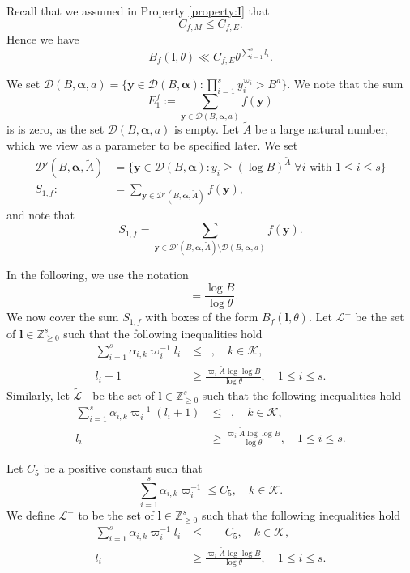 \documentclass[JEP,XML,SOM,Unicode,published]{cedram}
\DeclareMathOperator{\LBt}{\mathit{L(B,\theta)}}
\newcommand{\cD}{\mathcal{D}}
\newcommand{\cBalp}{\cD(B,\bfalp)}
\newcommand{\cBalpa}{\cD(B,\bfalp,a)}
\newcommand{\cBalpA}{\cD'(B,\bfalp,\tilde A)}
\let\tet\theta
\newcommand{\bfy}{\boldsymbol{y}}
\newcommand{\bfalp}{\boldsymbol{\alpha}}
\newcommand{\bfl}{\boldsymbol{l}}
\newcommand{\calK}{\mathcal{K}}
\newcommand{\calL}{\mathcal{L}}
\newcommand{\Z}{\mathbb{Z}}
\theoremstyle{definition}
\numberwithin{theorem}{section}
\begin{document}
Recall that we assumed in Property \ref{property:I} that
\begin{equation*}
C_{f,M}\leq C_{f,E}.
\end{equation*}
Hence we have
\begin{equation}\label{eqn22}
B_f(\bfl,\tet)\ll C_{f,E} \tet^{\sum_{i=1}^s l_i}.
\end{equation}

We set $\cBalpa=\{\bfy\in\cBalp:\prod_{i=1}^sy_i^{\varpi_i}>B^a\}$. We note that the sum
\[
E_1^f:= \sum_{\bfy\in\cBalpa}f(\bfy)
\]
is is zero, as the set $\cBalpa$ is empty.
Let $\tilde{A}$ be a large natural number, which we view as a parameter to be specified later.
We set
\begin{align*}
\cBalpA&=\bigl\{\bfy\in\cBalp:y_i\geq(\log B)^{\tilde{A}}\; \forall i \text{ with }1\leq i\leq s\bigr\}\\
\tag*{and}
S_{1,f}:\!&= \sum_{\bfy\in \cBalpA}f(\bfy),
\end{align*}
and note that
\[
S_{1,f}= \sum_{\bfy\in \cBalpA\setminus\cBalpa}f(\bfy).
\]

In the following, we use the notation
\[\LBt=\frac{\log B}{\log\theta}.\]
We now cover the sum $S_{1,f}$ with boxes of the form $B_f(\bfl,\tet)$. Let $\calL^+$ be the set of $\bfl\in \Z_{\geq 0}^s$ such that the following inequalities hold
\begin{align*}
\sum_{i=1}^s \alpha_{i,k} \varpi_i^{-1}l_i&\leq \LBt,\quad k\in \calK,\\
l_i+1&\geq \frac{\varpi_i \tilde{A} \log \log B}{\log \tet},\quad 1\leq i\leq s.
\end{align*}
Similarly, let $\widetilde{\calL}^-$ be the set of $\bfl\in \Z_{\geq 0}^s$ such that the following inequalities hold
\begin{align*}
\sum_{i=1}^s \alpha_{i,k} \varpi_i^{-1}(l_i +1)&\leq \LBt,\quad k\in \calK,\\
l_i&\geq \frac{\varpi_i \tilde{A} \log \log B}{\log \tet},\quad 1\leq i\leq s.
\end{align*}

Let $C_5$ be a positive constant such that
\[
\sum_{i=1}^s \alpha_{i,k} \varpi_i^{-1}\leq C_5, \quad k\in \calK.
\]
We define $\calL^-$ to be the set of $\bfl\in \Z_{\geq 0}^s$ such that the following inequalities hold
\begin{align*}
\sum_{i=1}^s \alpha_{i,k} \varpi_i^{-1}l_i &\leq \LBt - C_5, \quad k\in \calK,\\
l_i&\geq \frac{\varpi_i \tilde{A} \log \log B}{\log \tet},\quad 1\leq i\leq s.
\end{align*}
\end{document}
